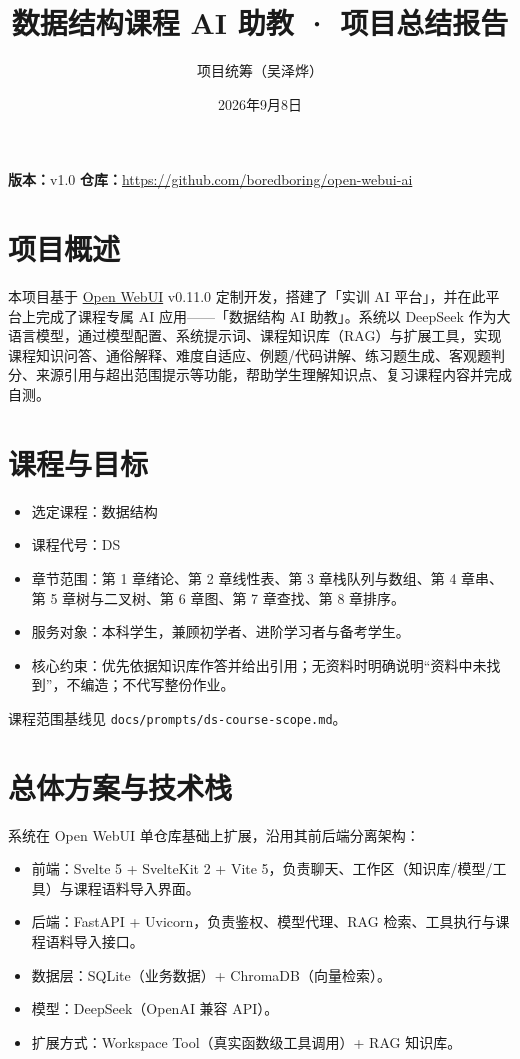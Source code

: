 \documentclass[12pt,a4paper]{ctexart}
\title{数据结构课程 AI 助教 · 项目总结报告}
\author{项目统筹（吴泽烨）}
\date{2026年9月8日}
\begin{document}
\maketitle

\begin{center}
\textbf{版本：}v1.0 \qquad \textbf{仓库：}\url{https://github.com/boredboring/open-webui-ai}
\end{center}

\section{项目概述}

本项目基于 \href{https://github.com/open-webui/open-webui}{Open WebUI} v0.11.0 定制开发，搭建了「实训 AI 平台」，并在此平台上完成了课程专属 AI 应用——「数据结构 AI 助教」。系统以 DeepSeek 作为大语言模型，通过模型配置、系统提示词、课程知识库（RAG）与扩展工具，实现课程知识问答、通俗解释、难度自适应、例题/代码讲解、练习题生成、客观题判分、来源引用与超出范围提示等功能，帮助学生理解知识点、复习课程内容并完成自测。

\section{课程与目标}

\begin{itemize}
  \item 选定课程：数据结构
  \item 课程代号：DS
  \item 章节范围：第 1 章绪论、第 2 章线性表、第 3 章栈队列与数组、第 4 章串、第 5 章树与二叉树、第 6 章图、第 7 章查找、第 8 章排序。
  \item 服务对象：本科学生，兼顾初学者、进阶学习者与备考学生。
  \item 核心约束：优先依据知识库作答并给出引用；无资料时明确说明“资料中未找到”，不编造；不代写整份作业。
\end{itemize}

课程范围基线见 \texttt{docs/prompts/ds-course-scope.md}。

\section{总体方案与技术栈}

系统在 Open WebUI 单仓库基础上扩展，沿用其前后端分离架构：

\begin{itemize}
  \item 前端：Svelte 5 + SvelteKit 2 + Vite 5，负责聊天、工作区（知识库/模型/工具）与课程语料导入界面。
  \item 后端：FastAPI + Uvicorn，负责鉴权、模型代理、RAG 检索、工具执行与课程语料导入接口。
  \item 数据层：SQLite（业务数据）+ ChromaDB（向量检索）。
  \item 模型：DeepSeek（OpenAI 兼容 API）。
  \item 扩展方式：Workspace Tool（真实函数级工具调用）+ RAG 知识库。
\end{itemize}
\end{document}
